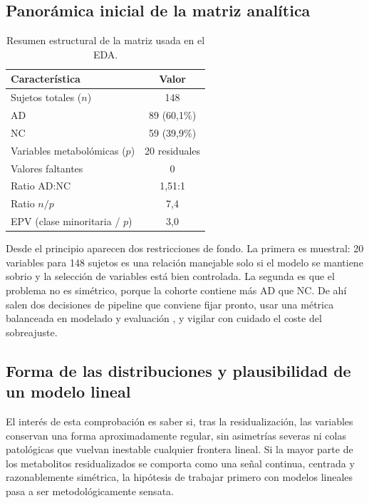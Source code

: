 \subsection{Panorámica inicial de la matriz analítica}

\begin{table}[ht]
\centering
\caption{Resumen estructural de la matriz usada en el EDA.}
\label{tab:resumen_matriz}
\begin{tabular}{lc}
\hline
\textbf{Característica} & \textbf{Valor} \\
\hline
Sujetos totales ($n$) & 148 \\
AD & 89 (60,1\%) \\
NC & 59 (39,9\%) \\
Variables metabolómicas ($p$) & 20 residuales \\
Valores faltantes & 0 \\
Ratio AD:NC & 1,51:1 \\
Ratio $n/p$ & 7,4 \\
EPV (clase minoritaria / $p$) & 3,0 \\
\hline
\end{tabular}
\end{table}

Desde el principio aparecen dos restricciones de fondo. La primera es muestral: 20 variables para 148 sujetos es una
relación manejable solo si el modelo se mantiene sobrio y la selección de variables está bien controlada. La segunda es
que el problema no es simétrico, porque la cohorte contiene más AD que NC. De ahí salen dos decisiones de pipeline que
conviene fijar pronto, usar una métrica balanceada en modelado y evaluación \parencite{brodersen2010balanced,powers2011evaluation}, y vigilar con cuidado el coste del
sobreajuste.

\subsection{Forma de las distribuciones y plausibilidad de un modelo lineal}

El interés de esta comprobación es saber si, tras la residualización, las variables conservan una forma aproximadamente
regular, sin asimetrías severas ni colas patológicas que vuelvan inestable cualquier frontera lineal. Si la mayor parte
de los metabolitos residualizados se comporta como una señal continua, centrada y razonablemente simétrica, la hipótesis
de trabajar primero con modelos lineales pasa a ser metodológicamente sensata.

